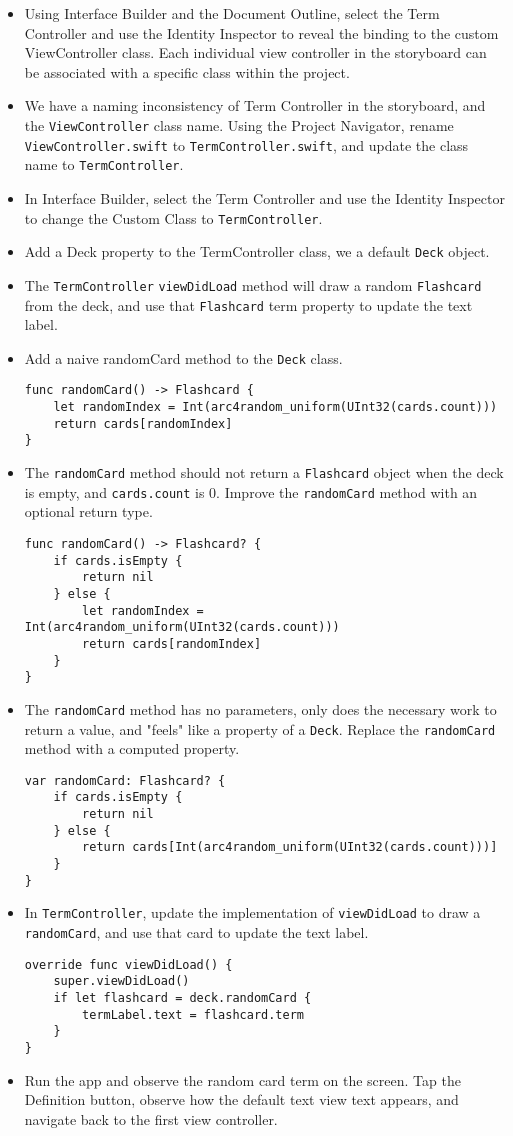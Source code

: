 \documentclass[a4paper,11pt]{scrartcl}
\begin{document}
\begin{itemize}
\item Using Interface Builder and the Document Outline, select the Term Controller and use the Identity Inspector to reveal the binding to the custom ViewController class. Each individual view controller in the storyboard can be associated with a specific class within the project.
\item We have a naming inconsistency of Term Controller in the storyboard, and the \texttt{ViewController} class name. Using the Project Navigator, rename \texttt{ViewController.swift} to \texttt{TermController.swift}, and update the class name to \texttt{TermController}.
\item In Interface Builder, select the Term Controller and use the Identity Inspector to change the Custom Class to \texttt{TermController}.
\item Add a Deck property to the TermController class, we a default \texttt{Deck} object.
\item The \texttt{TermController} \texttt{viewDidLoad} method will draw a random \texttt{Flashcard} from the deck, and use that \texttt{Flashcard} term property to update the text label.
\item Add a naive randomCard method to the \texttt{Deck} class.
\begin{lstlisting}
func randomCard() -> Flashcard {
	let randomIndex = Int(arc4random_uniform(UInt32(cards.count)))
	return cards[randomIndex]
}
\end{lstlisting}
\item The \texttt{randomCard} method should not return a \texttt{Flashcard} object when the deck is empty, and \texttt{cards.count} is 0. Improve the \texttt{randomCard} method with an optional return type.
\begin{lstlisting}
func randomCard() -> Flashcard? {
	if cards.isEmpty {
		return nil
	} else {
		let randomIndex = Int(arc4random_uniform(UInt32(cards.count)))
		return cards[randomIndex]
	}
}
\end{lstlisting}
\item The \texttt{randomCard} method has no parameters, only does the necessary work to return a value, and "feels" like a property of a \texttt{Deck}. Replace the \texttt{randomCard} method with a computed property.
\begin{lstlisting}
var randomCard: Flashcard? {
	if cards.isEmpty {
		return nil
	} else {
		return cards[Int(arc4random_uniform(UInt32(cards.count)))]
	}
}
\end{lstlisting}
\item In \texttt{TermController}, update the implementation of \texttt{viewDidLoad} to draw a \texttt{randomCard}, and use that card to update the text label.
\begin{lstlisting}
override func viewDidLoad() {
	super.viewDidLoad()
	if let flashcard = deck.randomCard {
		termLabel.text = flashcard.term
	}
}
\end{lstlisting}
\item Run the app and observe the random card term on the screen. Tap the Definition button, observe how the default text view text appears, and navigate back to the first view controller.
\end{itemize}
\end{document}
